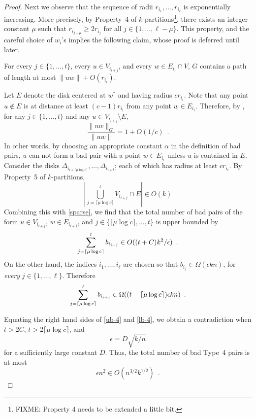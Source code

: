 \documentclass{patmorin}
\begin{document}
\begin{proof}
  Next we observe that the sequence of radii $r_{i_1},\ldots,r_{i_\ell}$
  is exponentially increasing.  More precisely, by Property~4 of
  $k$-partitions\footnote{FIXME: Property 4 needs to be extended a little
  bit.}, there exists an integer constant $\mu$ such that $r_{i_{j+\mu}}
  \ge 2r_{i_j}$ for all $j\in\{1,\ldots,\ell-\mu\}$.  This property,
  and the careful choice of $w_i$'s implies the following claim, whose
  proof is deferred until later.
  \begin{clm}
    For every $j\in\{1,\ldots,t\}$, every $u\in V_{i_{i+j}}$, and
    every $w\in E_{i_i}\cap V$, $G$ contains a path of length at most
    $\|uw\|+O(r_{i_i})$.
  \end{clm}

  Let $E$ denote the disk centered at $w^*$ and having radius $cr_{i_i}$.
  Note that any point $u\not\in E$ is at distance at least $(c-1)r_{i_i}$
  from any point $w\in E_{i_i}$.  Therefore, by , for any
  $j\in\{1,\ldots,t\}$ and any $u\in V_{i_{i+j}}\setminus E$,
  \[  
     \frac{\|uw\|_G}{\|uw\|} = 1+O(1/c) \enspace . 
  \]
  In other words, by choosing an appropriate constant $\alpha$ in the
  definition of bad pairs, $u$ can not form a bad pair with a point
  $w\in E_{i_i}$ unless $u$ is contained in $E$.  Consider the disks
  $\Delta_{i_{i+\lceil\mu\log c\rceil}},\ldots,\Delta_{i_{i+t}}$; each
  of which has radius at least $cr_{i_i}$.  By Property~5 of $k$-partitions,
  \[
    \left|\bigcup_{j=\lceil\mu\log c\rceil}^t V_{i_{i+j}}\cap E\right|
      \in O(k)
  \]
  Combining this with \eqref{sparse}, we find that the total number
  of bad pairs of the form $u\in V_{i_{i+j}}$, $w\in E_{i_{i+j}}$,
  and $j\in\{\lceil\mu\log c\rceil,\ldots,t\}$ is upper bounded by
  \begin{equation}
     \sum_{j=\lceil\mu\log c\rceil}^t b_{i_{i+j}} 
        \in O((t+C)k^2/\epsilon) \enspace . \eqlabel{ub-4}
  \end{equation}
  On the other hand, the indices $i_1,\ldots,i_\ell$ are chosen
  so that $b_{i_j}\in\Omega(\epsilon kn)$, for \emph{every}
  $j\in\{1,\ldots,\ell\}$.  Therefore
  \begin{equation}
    \sum_{j=\lceil\mu\log c\rceil}^t b_{i_{i+j}} 
        \in \Omega((t-\lceil\mu\log c\rceil)\epsilon kn) \enspace .
        \eqlabel{lb-4}
  \end{equation}
 
  Equating the right hand sides of \eqref{ub-4} and \eqref{lb-4}, we
  obtain a contradiction when $t>2C$, $t>2\lceil\mu\log c\rceil$, and
  \[
      \epsilon = D\sqrt{k/n}
  \] 
  for a sufficiently large constant $D$.
  Thus, the total number of bad Type~4 pairs is at most
  \[
    \epsilon n^2 \in O(n^{3/2}k^{1/2}) \enspace .
  \]


\end{proof}
\end{document}
